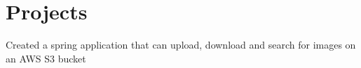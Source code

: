 \documentclass[]{hieudo-build}
\begin{document}
\begin{minipage}[t]{0.65\textwidth}
\sectionsep

\section{Projects}

\descript{}
Created a spring application that can upload, download and search for images on an AWS S3 bucket
\sectionsep 




\end{minipage} 
\end{document}
